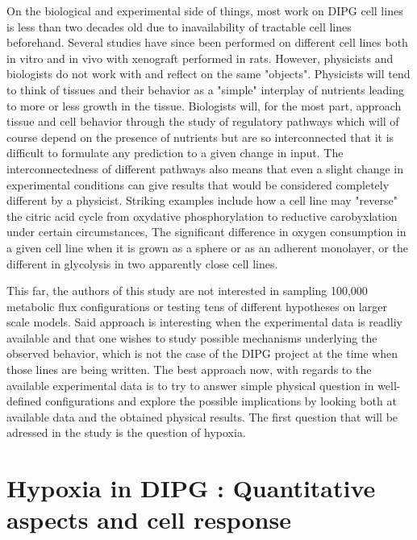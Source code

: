 \documentclass[11pt,a4paper]{article}
\begin{document}
On the biological and experimental side of things, most work on DIPG cell lines is less than two decades old due to inavailability of tractable cell lines beforehand. Several studies have since been performed on different cell lines both in vitro and in vivo with xenograft performed in rats. However, physicists and biologists do not work with and reflect on the same "objects". Physicists will tend to think of tissues and their behavior as a "simple" interplay of nutrients leading to more or less growth in the tissue. Biologists will, for the most part, approach tissue and cell behavior through the study of regulatory pathways which will of course depend on the presence of nutrients but are so interconnected that it is difficult to formulate any prediction to a given change in input. The interconnectedness of different pathways also means that even a slight change in experimental conditions can give results that would be considered completely different by a physicist. Striking examples include how a cell line may "reverse" the citric acid cycle from oxydative phosphorylation to reductive carobyxlation under certain circumstances, The significant difference in oxygen consumption in a given cell line when it is grown as a sphere or as an adherent monolayer, or the different in glycolysis in two apparently close cell lines.

This far, the authors of this study are not interested in sampling 100,000 metabolic flux configurations or testing tens of different hypotheses on larger scale models. Said approach is interesting when the experimental data is readliy available and that one wishes to study possible mechanisms underlying the observed behavior, which is not the case of the DIPG project at the time when those lines are being written. The best approach now, with regards to the available experimental data is to try to answer simple physical question in well-defined configurations and explore the possible implications by looking both at available data and the obtained physical results. The first question that will be adressed in the study is the question of hypoxia.

\section{Hypoxia in DIPG : Quantitative aspects and cell response}
\end{document}
